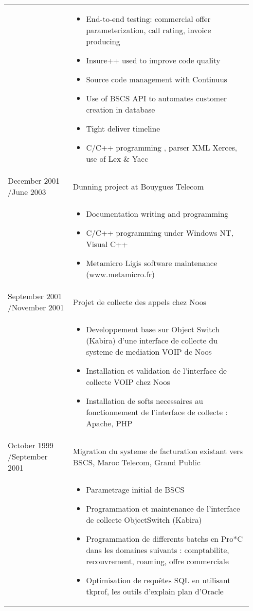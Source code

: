 \documentclass[a4paper,11pt]{letter}
\begin{document}
\begin{tabular}{p{}p{}}
& \begin{itemize}
\item     End-to-end testing: commercial offer parameterization, call rating, invoice producing
\item     Insure++ used to improve code quality
\item     Source code management with Continuus
\item     Use of BSCS API to automates customer creation in database
\item     Tight deliver timeline
\item     C/C++ programming , parser XML Xerces, use of Lex \& Yacc
\end{itemize} \\

	

December 2001 \slash June 2003 & Dunning project at Bouygues Telecom \\
	

& \begin{itemize}
\item     Documentation writing and programming 
\item     C/C++ programming under Windows NT, Visual C++
\item     Metamicro Ligis software maintenance (www.metamicro.fr)
\end{itemize} \\
	

September 2001 \slash November 2001 & Projet de collecte des appels chez Noos \\

& \begin{itemize}
\item     Developpement base sur Object Switch (Kabira) d'une interface de collecte du systeme de mediation VOIP de Noos
\item     Installation et validation de l'interface de collecte VOIP chez Noos
\item     Installation de softs necessaires au fonctionnement de l'interface de collecte : Apache, PHP 
\end{itemize} \\

	

October 1999 \slash September 2001 & Migration du systeme de facturation existant vers BSCS, Maroc Telecom, Grand Public\\
	

& \begin{itemize}
\item     Parametrage initial de BSCS
\item     Programmation et maintenance de l'interface de collecte ObjectSwitch (Kabira)
\item     Programmation de differents batchs en Pro*C dans les domaines suivants : comptabilite, recouvrement, roaming, offre commerciale
\item     Optimisation de requêtes SQL en utilisant tkprof, les outils d'explain plan d'Oracle
\end{itemize} \\


\end{tabular}
\end{document}
